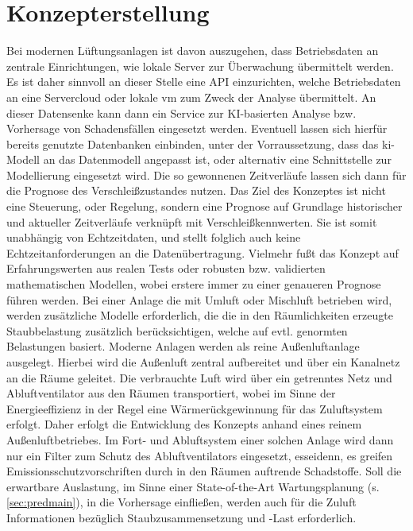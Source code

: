 \chapter{Konzepterstellung}
\label{ch:konzept}
    Bei modernen Lüftungsanlagen ist davon auszugehen, dass Betriebsdaten an zentrale Einrichtungen, wie lokale Server zur Überwachung übermittelt werden. Es ist daher sinnvoll an dieser Stelle eine API einzurichten, welche Betriebsdaten an eine Servercloud oder lokale \ac{vm} zum Zweck der Analyse übermittelt. An dieser Datensenke kann dann ein Service zur KI-basierten Analyse bzw. Vorhersage von Schadensfällen eingesetzt werden. Eventuell lassen sich hierfür bereits genutzte Datenbanken einbinden, unter der Vorraussetzung, dass das \ac{ki}-Modell an das Datenmodell angepasst ist, oder alternativ eine Schnittstelle zur Modellierung eingesetzt wird. Die so gewonnenen Zeitverläufe lassen sich dann für die Prognose des Verschleißzustandes nutzen. Das Ziel des Konzeptes ist nicht eine Steuerung, oder Regelung, sondern eine Prognose auf Grundlage historischer und aktueller Zeitverläufe verknüpft mit Verschleißkennwerten. Sie ist somit unabhängig von Echtzeitdaten, und stellt folglich auch keine Echtzeitanforderungen an die Datenübertragung. Vielmehr fußt das Konzept auf Erfahrungswerten aus realen Tests oder robusten bzw. validierten mathematischen Modellen, wobei erstere immer zu einer genaueren Prognose führen werden. 
    Bei einer Anlage die mit Umluft oder Mischluft betrieben wird, werden zusätzliche Modelle erforderlich, die die in den Räumlichkeiten erzeugte Staubbelastung zusätzlich berücksichtigen, welche auf evtl. genormten Belastungen basiert.
    Moderne Anlagen werden als reine Außenluftanlage ausgelegt. Hierbei wird die Außenluft zentral aufbereitet und über ein Kanalnetz an die Räume geleitet. Die verbrauchte Luft wird über ein getrenntes Netz und Abluftventilator aus den Räumen transportiert, wobei im Sinne der Energieeffizienz in der Regel eine Wärmerückgewinnung für das Zuluftsystem erfolgt. \cite{tavg}
    Daher erfolgt die Entwicklung des Konzepts anhand eines reinem Außenluftbetriebes. Im Fort- und Abluftsystem einer solchen Anlage wird dann nur ein Filter zum Schutz des Abluftventilators eingesetzt, esseidenn, es greifen Emissionsschutzvorschriften durch in den Räumen auftrende Schadstoffe.
    Soll die erwartbare Auslastung, im Sinne einer State-of-the-Art Wartungsplanung (s. \ref{sec:predmain}), in die Vorhersage einfließen, werden auch für die Zuluft Informationen bezüglich Staubzusammensetzung und -Last erforderlich. 
